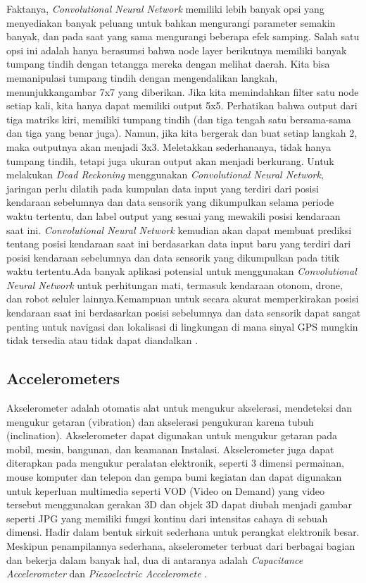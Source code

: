 Faktanya, \emph{Convolutional Neural Network} memiliki lebih banyak opsi yang menyediakan banyak peluang untuk bahkan mengurangi parameter semakin banyak, dan pada saat yang sama 
mengurangi beberapa efek samping. Salah satu opsi ini adalah hanya berasumsi bahwa node layer berikutnya memiliki banyak tumpang tindih dengan tetangga mereka dengan melihat daerah.
Kita bisa memanipulasi tumpang tindih dengan mengendalikan langkah, menunjukkangambar 7x7 yang diberikan. Jika kita memindahkan filter satu node setiap kali, kita hanya dapat 
memiliki output 5x5. Perhatikan bahwa output dari tiga matriks kiri, memiliki tumpang tindih (dan tiga tengah satu bersama-sama dan tiga yang benar juga). Namun, jika kita bergerak
dan buat setiap langkah 2, maka outputnya akan menjadi 3x3. Meletakkan sederhananya, tidak hanya tumpang tindih, tetapi juga ukuran output akan menjadi berkurang. Untuk melakukan 
\emph{Dead Reckoning} menggunakan \emph{Convolutional Neural Network}, jaringan perlu dilatih pada kumpulan data input yang terdiri dari posisi kendaraan sebelumnya dan data sensorik yang dikumpulkan selama periode waktu 
tertentu, dan label output yang sesuai yang mewakili posisi kendaraan saat ini. \emph{Convolutional Neural Network}  kemudian akan dapat membuat prediksi tentang posisi kendaraan saat ini berdasarkan data input baru 
yang terdiri dari posisi kendaraan sebelumnya dan data sensorik yang dikumpulkan pada titik waktu tertentu.Ada banyak aplikasi potensial untuk menggunakan \emph{Convolutional Neural Network}  untuk perhitungan mati, 
termasuk kendaraan otonom, drone, dan robot seluler lainnya.Kemampuan untuk secara akurat memperkirakan posisi kendaraan saat ini berdasarkan posisi sebelumnya dan data sensorik dapat 
sangat penting untuk navigasi dan lokalisasi di lingkungan di mana sinyal GPS mungkin tidak tersedia atau tidak dapat diandalkan \parencite{Albawi2017}. 

\subsection{Accelerometers}

Akselerometer adalah otomatis alat untuk mengukur akselerasi, mendeteksi dan mengukur getaran (vibration) dan akselerasi pengukuran karena tubuh (inclination). Akselerometer dapat 
digunakan untuk mengukur getaran pada mobil, mesin, bangunan, dan keamanan Instalasi. Akselerometer juga dapat diterapkan pada mengukur peralatan elektronik, seperti 3 dimensi permainan, 
mouse komputer dan telepon dan gempa bumi kegiatan dan dapat digunakan untuk keperluan multimedia seperti VOD (Video on Demand) yang video tersebut menggunakan gerakan 3D dan objek 3D 
dapat diubah menjadi gambar seperti JPG yang memiliki fungsi kontinu dari intensitas cahaya di sebuah dimensi. Hadir dalam bentuk sirkuit sederhana untuk perangkat elektronik besar. 
Meskipun penampilannya sederhana, akselerometer terbuat dari berbagai bagian dan bekerja dalam banyak hal, dua di antaranya adalah \emph{Capacitance Accelerometer} 
dan \emph{Piezoelectric Acceleromete} \parencite{Randell2003}. 

